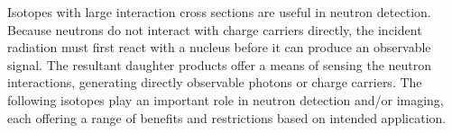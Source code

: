 \documentclass[../../../../main.tex]{subfiles}
\begin{document}
%
    \Xsubsubsection%
    Isotopes with large interaction cross sections are useful in neutron detection.
    Because neutrons do not interact with charge carriers directly, the incident radiation must first react with a nucleus before it can produce an observable signal.
    The resultant daughter products offer a means of sensing the neutron interactions, generating directly observable photons or charge carriers.
    The following isotopes play an important role in neutron detection and/or imaging, each offering a range of benefits and restrictions based on intended application.
\end{document}
